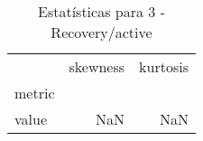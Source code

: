 \begin{table}[htbp]
\caption{Estatísticas para 3 - Recovery/active}
\label{tab:3_-_recovery_active_skewkurt}
\begin{tabular}{lrr}
\toprule
 & skewness & kurtosis \\
metric &  &  \\
\midrule
value & NaN & NaN \\
\bottomrule
\end{tabular}
\end{table}
